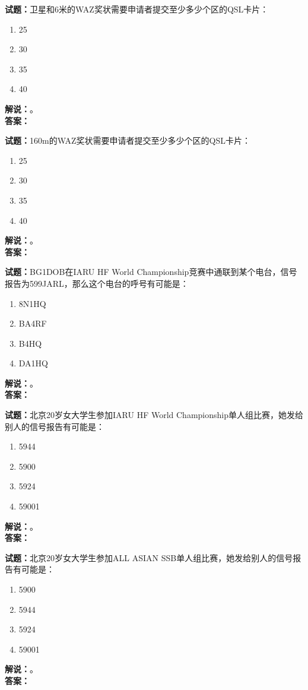 \documentclass{ctexbook}
\begin{document}
\noindent\textbf{试题：}卫星和6米的WAZ奖状需要申请者提交至少多少个区的QSL卡片：
\begin{enumerate}[leftmargin=3em]
  \item 25
  \item 30
  \item 35
  \item 40
\end{enumerate}
\noindent\textbf{解说：}\textbf{}。\\\noindent\textbf{答案：}

\bigskip

\noindent\textbf{试题：}160m的WAZ奖状需要申请者提交至少多少个区的QSL卡片：
\begin{enumerate}[leftmargin=3em]
  \item 25
  \item 30
  \item 35
  \item 40
\end{enumerate}
\noindent\textbf{解说：}\textbf{}。\\\noindent\textbf{答案：}

\bigskip

\noindent\textbf{试题：}BG1DOB在IARU HF World Championship竞赛中通联到某个电台，信号报告为599JARL，那么这个电台的呼号有可能是：
\begin{enumerate}[leftmargin=3em]
  \item 8N1HQ
  \item BA4RF
  \item B4HQ
  \item DA1HQ
\end{enumerate}
\noindent\textbf{解说：}\textbf{}。\\\noindent\textbf{答案：}

\bigskip

\noindent\textbf{试题：}北京20岁女大学生参加IARU HF World Championship单人组比赛，她发给别人的信号报告有可能是：
\begin{enumerate}[leftmargin=3em]
  \item 5944
  \item 5900
  \item 5924
  \item 59001
\end{enumerate}
\noindent\textbf{解说：}\textbf{}。\\\noindent\textbf{答案：}

\bigskip

\noindent\textbf{试题：}北京20岁女大学生参加ALL ASIAN SSB单人组比赛，她发给别人的信号报告有可能是：
\begin{enumerate}[leftmargin=3em]
  \item 5900
  \item 5944
  \item 5924
  \item 59001
\end{enumerate}
\noindent\textbf{解说：}\textbf{}。\\\noindent\textbf{答案：}
\end{document}
